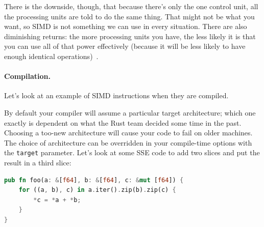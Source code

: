 \documentclass[a4paper]{report}
\begin{document}
There is the downside, though, that because there's only the one control unit, all the processing units are told to do the same thing. That might not be what you want, so SIMD is not something we can use in every situation. There are also diminishing returns: the more processing units you have, the less likely it is that you can use all of that power effectively (because it will be less likely to have enough identical operations)~\cite{sse}.

\paragraph{Compilation.} Let's look at an example of SIMD instructions when they are compiled.

By default your compiler will assume a particular target architecture; which one exactly is dependent on what the Rust team decided some time in the past. Choosing a too-new architecture will cause your code to fail on older machines. The choice of architecture can be overridden in your compile-time options with the \texttt{target} parameter. Let's look at some SSE code to add two slices and put the result in a third slice:

\begin{lstlisting}[language=Rust]
pub fn foo(a: &[f64], b: &[f64], c: &mut [f64]) {
    for ((a, b), c) in a.iter().zip(b).zip(c) {
        *c = *a + *b;
    }
}\end{lstlisting}

\end{document}
